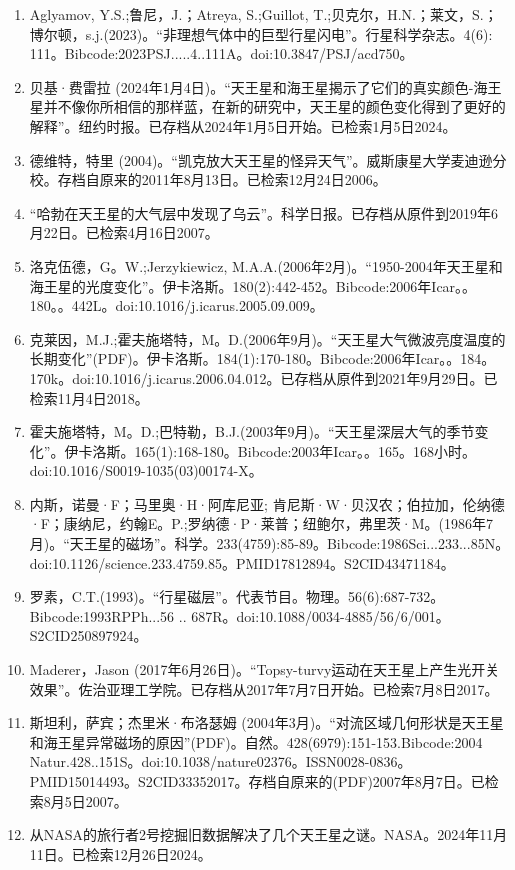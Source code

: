 \begin{enumerate}
\item Aglyamov, Y.S.;鲁尼，J.；Atreya, S.;Guillot, T.;贝克尔，H.N.；莱文，S.；博尔顿，s.j.(2023)。“非理想气体中的巨型行星闪电”。行星科学杂志。4(6): 111。Bibcode:2023PSJ.....4..111A。doi:10.3847/PSJ/acd750。
\item 贝基·费雷拉 (2024年1月4日)。“天王星和海王星揭示了它们的真实颜色-海王星并不像你所相信的那样蓝，在新的研究中，天王星的颜色变化得到了更好的解释”。纽约时报。已存档从2024年1月5日开始。已检索1月5日2024。
\item 德维特，特里 (2004)。“凯克放大天王星的怪异天气”。威斯康星大学麦迪逊分校。存档自原来的2011年8月13日。已检索12月24日2006。
\item “哈勃在天王星的大气层中发现了乌云”。科学日报。已存档从原件到2019年6月22日。已检索4月16日2007。
\item 洛克伍德，G。W.;Jerzykiewicz, M.A.A.(2006年2月)。“1950-2004年天王星和海王星的光度变化”。伊卡洛斯。180(2):442-452。Bibcode:2006年Icar。。180。。442L。doi:10.1016/j.icarus.2005.09.009。
\item 克莱因，M.J.;霍夫施塔特，M。D.(2006年9月)。“天王星大气微波亮度温度的长期变化”(PDF)。伊卡洛斯。184(1):170-180。Bibcode:2006年Icar。。184。170k。doi:10.1016/j.icarus.2006.04.012。已存档从原件到2021年9月29日。已检索11月4日2018。
\item 霍夫施塔特，M。D.;巴特勒，B.J.(2003年9月)。“天王星深层大气的季节变化”。伊卡洛斯。165(1):168-180。Bibcode:2003年Icar。。165。168小时。doi:10.1016/S0019-1035(03)00174-X。
\item 内斯，诺曼·F；马里奥·H·阿库尼亚; 肯尼斯·W·贝汉农；伯拉加，伦纳德·F；康纳尼，约翰E。P.;罗纳德·P·莱普；纽鲍尔，弗里茨·M。(1986年7月)。“天王星的磁场”。科学。233(4759):85-89。Bibcode:1986Sci...233...85N。doi:10.1126/science.233.4759.85。PMID17812894。S2CID43471184。   
\item 罗素，C.T.(1993)。“行星磁层”。代表节目。物理。56(6):687-732。Bibcode:1993RPPh...56 .. 687R。doi:10.1088/0034-4885/56/6/001。S2CID250897924。  
\item Maderer，Jason (2017年6月26日)。“Topsy-turvy运动在天王星上产生光开关效果”。佐治亚理工学院。已存档从2017年7月7日开始。已检索7月8日2017。
\item 斯坦利，萨宾；杰里米·布洛瑟姆 (2004年3月)。“对流区域几何形状是天王星和海王星异常磁场的原因”(PDF)。自然。428(6979):151-153.Bibcode:2004 Natur.428..151S。doi:10.1038/nature02376。ISSN0028-0836。PMID15014493。S2CID33352017。存档自原来的(PDF)2007年8月7日。已检索8月5日2007。    
\item 从NASA的旅行者2号挖掘旧数据解决了几个天王星之谜。NASA。2024年11月11日。已检索12月26日2024。

\end{enumerate}
